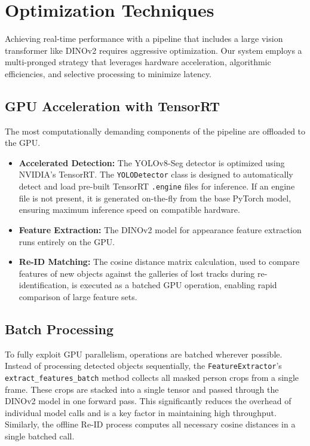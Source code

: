 \documentclass[conference]{IEEEtran}
\begin{document}
\section{Optimization Techniques}
Achieving real-time performance with a pipeline that includes a large vision transformer like DINOv2 requires aggressive optimization. Our system employs a multi-pronged strategy that leverages hardware acceleration, algorithmic efficiencies, and selective processing to minimize latency.

\subsection{GPU Acceleration with TensorRT}
The most computationally demanding components of the pipeline are offloaded to the GPU.
\begin{itemize}
    \item \textbf{Accelerated Detection:} The YOLOv8-Seg detector is optimized using NVIDIA's TensorRT. The \texttt{YOLODetector} class is designed to automatically detect and load pre-built TensorRT \texttt{.engine} files for inference. If an engine file is not present, it is generated on-the-fly from the base PyTorch model, ensuring maximum inference speed on compatible hardware.
    \item \textbf{Feature Extraction:} The DINOv2 model for appearance feature extraction runs entirely on the GPU.
    \item \textbf{Re-ID Matching:} The cosine distance matrix calculation, used to compare features of new objects against the galleries of lost tracks during re-identification, is executed as a batched GPU operation, enabling rapid comparison of large feature sets.
\end{itemize}

\subsection{Batch Processing}
To fully exploit GPU parallelism, operations are batched wherever possible. Instead of processing detected objects sequentially, the \texttt{FeatureExtractor}'s \texttt{extract\_features\_batch} method collects all masked person crops from a single frame. These crops are stacked into a single tensor and passed through the DINOv2 model in one forward pass. This significantly reduces the overhead of individual model calls and is a key factor in maintaining high throughput. Similarly, the offline Re-ID process computes all necessary cosine distances in a single batched call.
\end{document}
